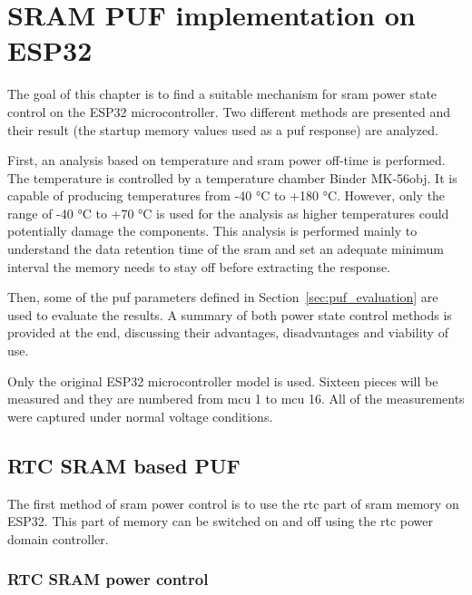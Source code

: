 \chapter{SRAM PUF implementation on ESP32}\label{sec:implementation}


The goal of this chapter is to find a suitable mechanism for \gls{sram} power state control on the ESP32 microcontroller. Two different methods are presented and their result (the startup memory values used as a \gls{puf} response) are analyzed. 

First, an analysis based on temperature and \gls{sram} power off-time is performed. The temperature is controlled by a temperature chamber Binder MK-56obj. It is capable of producing temperatures from -40 °C to +180 °C\cite{Binder2021}. However, only the range of -40 °C to +70 °C is used for the analysis as higher temperatures could potentially damage the components. This analysis is performed mainly to understand the data retention time of the \gls{sram} and set an adequate minimum interval the memory needs to stay off before extracting the response.

Then, some of the \gls{puf} parameters defined in Section~\ref{sec:puf_evaluation} are used to evaluate the results. A summary of both power state control methods is provided at the end, discussing their advantages, disadvantages and viability of use.

Only the original ESP32 microcontroller model is used. Sixteen pieces will be measured and they are numbered from \gls{mcu} 1 to \gls{mcu} 16. All of the measurements were captured under normal voltage conditions. 

\section{RTC SRAM based PUF}

The first method of \gls{sram} power control is to use the \gls{rtc} part of \gls{sram} memory on ESP32. This part of memory can be switched on and off using the \gls{rtc} power domain controller.
 
\subsection{RTC SRAM power control}

